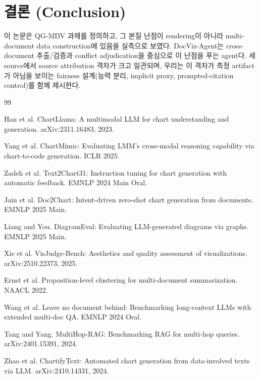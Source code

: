 \documentclass[11pt]{article}
\begin{document}
\section{결론 (Conclusion)}

이 논문은 QG-MDV 과제를 정의하고, 그 본질 난점이 rendering이 아니라 multi-document data
construction에 있음을 실측으로 보였다. DocViz-Agent는 cross-document 추출/검증과 conflict
adjudication을 중심으로 이 난점을 푸는 agent다. 세 source에서 source attribution 격차가 크고
일관되며, 우리는 이 격차가 측정 artifact가 아님을 보이는 fairness 설계(능력 분리, implicit
proxy, prompted-citation control)를 함께 제시한다.


\begin{thebibliography}{99}

Han et al. ChartLlama: A multimodal LLM for chart understanding and generation. arXiv:2311.16483, 2023.

Yang et al. ChartMimic: Evaluating LMM's cross-modal reasoning capability via chart-to-code generation. ICLR 2025.

Zadeh et al. Text2Chart31: Instruction tuning for chart generation with automatic feedback. EMNLP 2024 Main Oral.

Jain et al. Doc2Chart: Intent-driven zero-shot chart generation from documents. EMNLP 2025 Main.

Liang and You. DiagramEval: Evaluating LLM-generated diagrams via graphs. EMNLP 2025 Main.

Xie et al. VisJudge-Bench: Aesthetics and quality assessment of visualizations. arXiv:2510.22373, 2025.

Ernst et al. Proposition-level clustering for multi-document summarization. NAACL 2022.

Wang et al. Leave no document behind: Benchmarking long-context LLMs with extended multi-doc QA. EMNLP 2024 Oral.

Tang and Yang. MultiHop-RAG: Benchmarking RAG for multi-hop queries. arXiv:2401.15391, 2024.

Zhao et al. ChartifyText: Automated chart generation from data-involved texts via LLM. arXiv:2410.14331, 2024.

\end{thebibliography}
\end{document}
